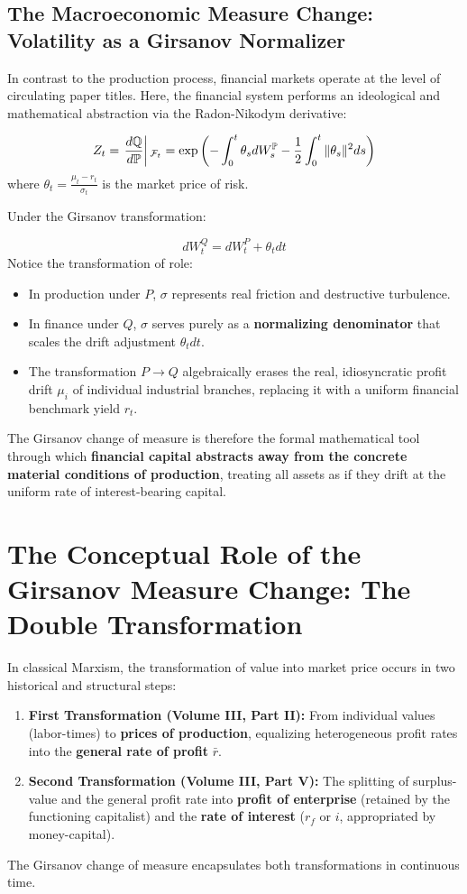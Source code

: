 \documentclass[11pt,letterpaper]{report}
\newcommand{\fitmath}[1]{\begingroup\setbox0=\hbox{$\displaystyle #1$}\ifdim\wd0>\linewidth\resizebox{\linewidth}{!}{$\displaystyle #1$}\else\displaystyle #1\fi\endgroup}
\begin{document}
\subsection{The Macroeconomic Measure Change: Volatility as a Girsanov Normalizer}
In contrast to the production process, financial markets operate at the level of circulating paper titles. Here, the financial system performs an ideological and mathematical abstraction via the Radon-Nikodym derivative:

\[\fitmath{Z_t = \left. \frac{d\mathbb{Q}}{d\mathbb{P}} \right\vert{}_{\mathcal{F}_t} = \exp\left( - \int_0^t \theta_s dW_s^\mathbb{P} - \frac{1}{2} \int_0^t \Vert{}\theta_s\Vert{}^2 ds \right)}\]
where ${\theta }_{t}=\frac{{\mu }_{t}-{r}_{t}}{{\sigma }_{t}}$ is the market price of risk.

Under the Girsanov transformation:

\[
d{W}_{t}^{Q}=d{W}_{t}^{P}+{\theta }_{t}dt
\]
Notice the transformation of role:

\begin{itemize}
\item In production under $P$, $\sigma$ represents real friction and destructive turbulence.
\item In finance under $Q$, $\sigma$ serves purely as a \textbf{normalizing denominator} that scales the drift adjustment ${\theta }_{t}dt$.
\item The transformation $P\rightarrow Q$ algebraically erases the real, idiosyncratic profit drift ${\mu }_{i}$ of individual industrial branches, replacing it with a uniform financial benchmark yield ${r}_{t}$.
\end{itemize}
The Girsanov change of measure is therefore the formal mathematical tool through which \textbf{financial capital abstracts away from the concrete material conditions of production}, treating all assets as if they drift at the uniform rate of interest-bearing capital.

\section{The Conceptual Role of the Girsanov Measure Change: The Double Transformation}
In classical Marxism, the transformation of value into market price occurs in two historical and structural steps:

\begin{enumerate}
\item \textbf{First Transformation (Volume III, Part II):} From individual values (labor-times) to \textbf{prices of production}, equalizing heterogeneous profit rates into the \textbf{general rate of profit} $\bar{r}$.
\item \textbf{Second Transformation (Volume III, Part V):} The splitting of surplus-value and the general profit rate into \textbf{profit of enterprise} (retained by the functioning capitalist) and the \textbf{rate of interest} (${r}_{f}$ or $i$, appropriated by money-capital).
\end{enumerate}
The Girsanov change of measure encapsulates both transformations in continuous time.
\end{document}

